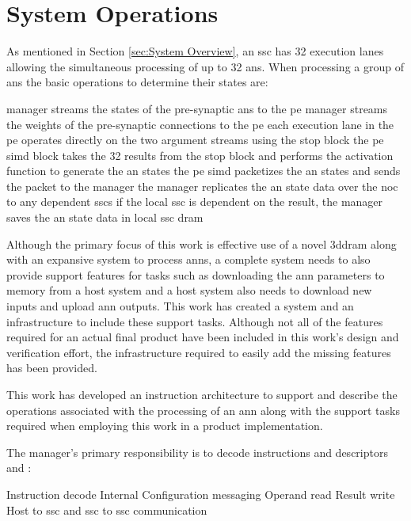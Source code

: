 

\chapter{System Operations}
\label{sec:System Operations}

As mentioned in Section \ref{sec:System Overview}, an \ac{ssc} has 32 execution lanes allowing the simultaneous processing of up to 32 \acp{an}.
When processing a group of \acp{an} the basic operations to determine their states are:
\begin{outline}
  \lbbcleanspace
  \1 manager streams the states of the pre-synaptic \acp{an} to the \ac{pe}
  \1 manager streams the weights of the pre-synaptic connections to the \ac{pe}
  \1 each execution lane in the \ac{pe} operates directly on the two argument streams using the \ac{stop} block
  \1 the \ac{pe} \ac{simd} block takes the 32 results from the \ac{stop} block and performs the activation function to generate the \ac{an} states
  \1 the \ac{pe} \ac{simd} packetizes the \ac{an} states and sends the packet to the manager
  \1 the manager replicates the \ac{an} state data over the \ac{noc} to any dependent \acp{ssc}
  \1 if the local \ac{ssc} is dependent on the result, the manager saves the \ac{an} state data in local \ac{ssc} \ac{dram}
\end{outline}

Although the primary focus of this work is effective use of a novel \ac{3ddram} along with an expansive system to process \acp{ann}, a complete system needs to also provide support features for tasks such as downloading the \ac{ann} parameters to memory from a host system and a host system also needs to download new inputs and upload \ac{ann} outputs.
This work has created a system and an infrastructure to include these support tasks.
Although not all of the features required for an actual final product have been included in this work's design and verification effort,  the infrastructure required to easily add the missing features has been provided.

This work has developed an instruction architecture to support and describe the operations associated with the processing of an \ac{ann} along with the support tasks required when employing this work in a product implementation.

\iffalse

The manager's primary responsibility is to decode instructions and descriptors and :

\begin{outline}
    \1 Instruction decode
    \1 Internal Configuration messaging
    \1 Operand read
    \1 Result write
    \1 Host to \ac{ssc} and \ac{ssc} to \ac{ssc} communication
\end{outline}


